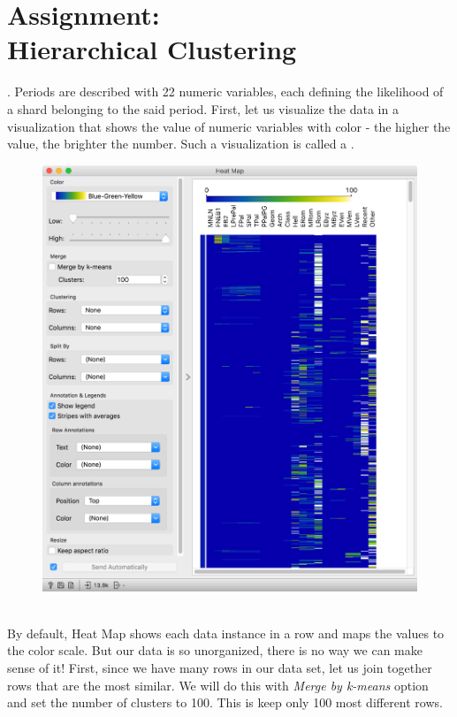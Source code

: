 \chapter{Assignment: \protect\\ Hierarchical Clustering}
\label{hw:arheo_hierarchical_clustering}

. Periods are described with 22 numeric variables, each defining the likelihood of a shard belonging to the said period. First, let us visualize the data in a visualization that shows the value of numeric variables with color - the higher the value, the brighter the number. Such a visualization is called a .

\begin{figure}[h]
    \centering
    \includegraphics[scale=0.35]{heat-map-original.png}
    \caption{$\;$} %
\end{figure}

By default, Heat Map shows each data instance in a row and maps the values to the color scale. But our data is so unorganized, there is no way we can make sense of it! First, since we have many rows in our data set, let us join together rows that are the most similar. We will do this with \textit{Merge by k-means} option and set the number of clusters to 100. This is keep only 100 most different rows.

